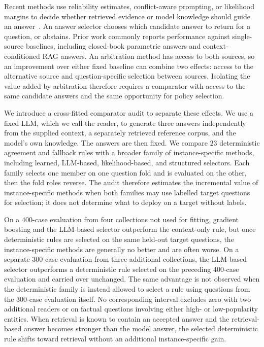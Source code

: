 \documentclass[sigconf]{acmart}
\begin{document}
Recent methods use reliability estimates, conflict-aware prompting, or
likelihood margins to decide whether retrieved evidence or model
knowledge should guide an answer~\cite{zhu2026saber,choi2025care,xu2026trustmargin}.
An answer selector chooses which candidate answer to return for a
question, or abstains. Prior work commonly reports performance against single-source baselines,
including closed-book parametric answers and context-conditioned RAG
answers. An arbitration method has access to both sources, so an
improvement over either fixed baseline can combine two effects: access
to the alternative source and question-specific selection between
sources. Isolating the value added by arbitration therefore requires a
comparator with access to the same candidate answers and the same
opportunity for policy selection.

We introduce a cross-fitted comparator audit to separate these effects.
We use a fixed LLM, which we call the reader, to generate three answers
independently from the supplied context, a separately retrieved
reference corpus, and the model's own knowledge. The answers are then
fixed. We compare $23$ deterministic agreement and fallback rules with
a broader family of instance-specific methods, including learned,
LLM-based, likelihood-based, and structured selectors. 
Each family selects one member on one question fold and is evaluated on the other,
then the fold roles reverse. The audit therefore estimates the
incremental value of instance-specific methods when both families may
use labelled target questions for selection; it does not determine what
to deploy on a target without labels.

On a $400$-case evaluation from four collections not used for fitting,
gradient boosting and the LLM-based selector outperform the context-only
rule, but once deterministic rules are selected on the same held-out
target questions, the instance-specific methods are generally no better
and are often worse. 
On a separate $300$-case evaluation from three additional collections,
the LLM-based selector outperforms a deterministic rule selected on the
preceding $400$-case evaluation and carried over unchanged. The same
advantage is not observed when the deterministic family is instead
allowed to select a rule using questions from the $300$-case evaluation
itself. No corresponding interval excludes zero with two additional readers or
on factual questions involving either high- or low-popularity entities. 
When retrieval is known to contain an accepted
answer and the retrieval-based answer becomes stronger than the model
answer, the selected deterministic rule shifts toward retrieval without
an additional instance-specific gain.
\end{document}
